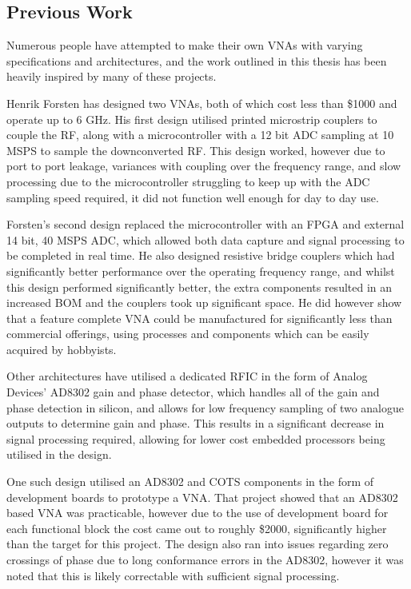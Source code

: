 \newpage
\subsection{Previous Work}
Numerous people have attempted to make their own VNAs with varying specifications and architectures, and the work outlined in this thesis has been heavily inspired by many of these projects. 

Henrik Forsten has designed two VNAs, both of which cost less than \$1000 and operate up to 6 GHz. His first design \cite{henrik_1} utilised printed microstrip couplers to couple the RF, along with a microcontroller with a 12 bit ADC sampling at 10 MSPS to sample the downconverted RF. This design worked, however due to port to port leakage, variances with coupling over the frequency range, and slow processing due to the microcontroller struggling to keep up with the ADC sampling speed required, it did not function well enough for day to day use.  

Forsten's second design \cite{henrik_2} replaced the microcontroller with an FPGA and external 14 bit, 40 MSPS ADC, which allowed both data capture and signal processing to be completed in real time. He also designed resistive bridge couplers which had significantly better performance over the operating frequency range, and whilst this design performed significantly better, the extra components resulted in an increased BOM and the couplers took up significant space. He did however show that a feature complete VNA could be manufactured for significantly less than commercial offerings, using processes and components which can be easily acquired by hobbyists.  

Other architectures have utilised a dedicated RFIC in the form of Analog Devices' AD8302 gain and phase detector, which handles all of the gain and phase detection in silicon, and allows for low frequency sampling of two analogue outputs to determine gain and phase. This results in a significant decrease in signal processing required, allowing for lower cost embedded processors being utilised in the design. 

One such design \cite{nagy_vna} utilised an AD8302 and COTS components in the form of development boards to prototype a VNA. That project showed that an AD8302 based VNA was practicable, however due to the use of development board for each functional block the cost came out to roughly \$2000, significantly higher than the target for this project. The design also ran into issues regarding zero crossings of phase due to long conformance errors in the AD8302, however it was noted that this is likely correctable with sufficient signal processing.  

